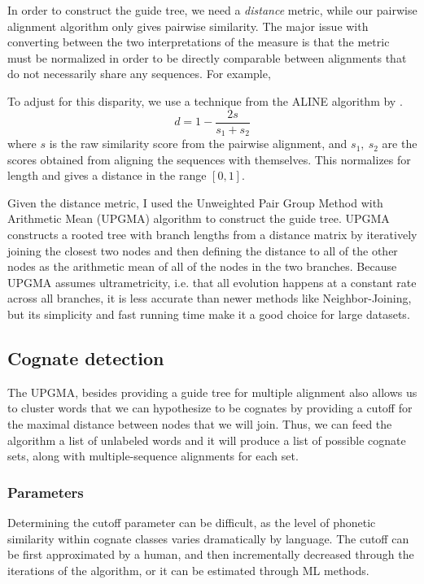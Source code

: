 \documentclass[doc,natbib]{apa6}
\begin{document}
In order to construct the guide tree, we need a \emph{distance} metric, while our pairwise alignment algorithm only gives pairwise similarity. The major issue with converting between the two interpretations of the measure is that the metric must be normalized in order to be directly comparable between alignments that do not necessarily share any sequences. For example, 
%
%	

To adjust for this disparity, we use a technique from the ALINE algorithm by \citet{Downey2008}. 
\begin{equation}
d = 1- \frac{2s}{s_1+s_2}
\end{equation}
where $s$ is the raw similarity score from the pairwise alignment, and $s_1,\ s_2$ are the scores obtained from aligning the sequences with themselves. This normalizes for length and gives a distance in the range $[0,1]$. 

Given the distance metric, I used the Unweighted Pair Group Method with Arithmetic Mean (UPGMA) algorithm to construct the guide tree. UPGMA constructs a rooted tree with branch lengths from a distance matrix by iteratively joining the closest two nodes and then defining the distance to all of the other nodes as the arithmetic mean of all of the nodes in the two branches. Because UPGMA assumes ultrametricity, i.e. that all evolution happens at a constant rate across all branches, it is less accurate than newer methods like Neighbor-Joining, but its simplicity and fast running time make it a good choice for large datasets.

\subsection{Cognate detection}

The UPGMA, besides providing a guide tree for multiple alignment also allows us to cluster words that we can hypothesize to be cognates by providing a cutoff for the maximal distance between nodes that we will join. Thus, we can feed the algorithm a list of unlabeled words and it will produce a list of possible cognate sets, along with multiple-sequence alignments for each set.  



\subsubsection{Parameters}
Determining the cutoff parameter can be difficult, as the level of phonetic similarity within cognate classes varies dramatically by language.  The cutoff can be first approximated by a human, and then incrementally decreased through the iterations of the algorithm, or it can be estimated through ML methods. 
\end{document}

